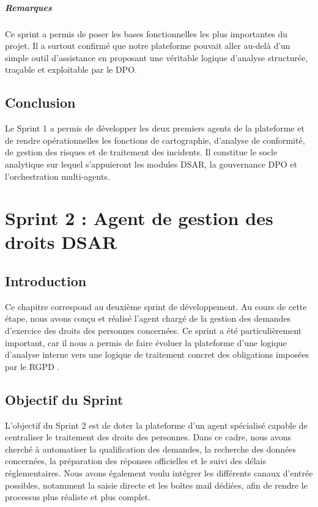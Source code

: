 \documentclass[12pt,a4paper]{report}
\begin{document}
\paragraph{Remarques}

Ce sprint a permis de poser les bases fonctionnelles les plus importantes du projet. Il a surtout confirmé que notre plateforme pouvait aller au-delà d'un simple outil d'assistance en proposant une véritable logique d'analyse structurée, traçable et exploitable par le DPO.

\section{Conclusion}

Le Sprint 1 a permis de développer les deux premiers agents de la plateforme et de rendre opérationnelles les fonctions de cartographie, d'analyse de conformité, de gestion des risques et de traitement des incidents. Il constitue le socle analytique sur lequel s'appuieront les modules DSAR, la gouvernance DPO et l'orchestration multi-agents.

\chapter{Sprint 2 : Agent de gestion des droits DSAR}

\section{Introduction}

Ce chapitre correspond au deuxième sprint de développement. Au cours de cette étape, nous avons conçu et réalisé l'agent chargé de la gestion des demandes d'exercice des droits des personnes concernées. Ce sprint a été particulièrement important, car il nous a permis de faire évoluer la plateforme d'une logique d'analyse interne vers une logique de traitement concret des obligations imposées par le RGPD \cite{rgpd}.

\section{Objectif du Sprint}

L'objectif du Sprint 2 est de doter la plateforme d'un agent spécialisé capable de centraliser le traitement des droits des personnes. Dans ce cadre, nous avons cherché à automatiser la qualification des demandes, la recherche des données concernées, la préparation des réponses officielles et le suivi des délais réglementaires. Nous avons également voulu intégrer les différents canaux d'entrée possibles, notamment la saisie directe et les boîtes mail dédiées, afin de rendre le processus plus réaliste et plus complet.
\end{document}
